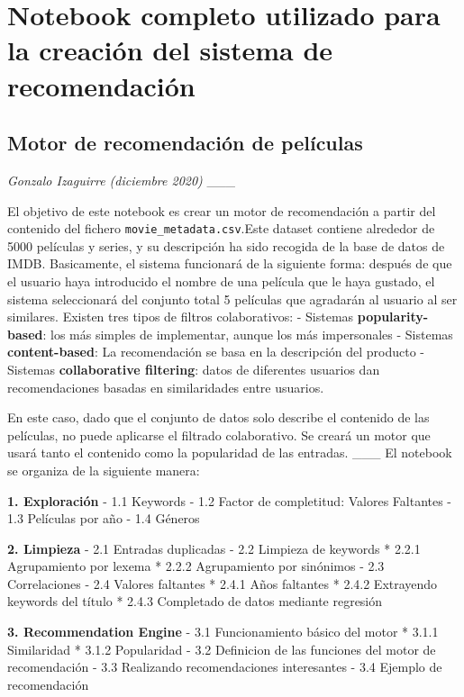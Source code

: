 \chapter{Notebook completo utilizado para la creación del sistema de recomendación}\label{app:notebook}

\section{\texorpdfstring{\textbf{Motor de recomendación de películas}}{Motor de recomendación de películas}}\label{film-recommendation-engine}

\emph{Gonzalo Izaguirre (diciembre 2020)} \_\_\_

El objetivo de este notebook es crear un motor de recomendación a partir
del contenido del fichero \texttt{movie\_metadata.csv}.Este dataset
contiene alrededor de 5000 películas y series, y su descripción ha sido
recogida de la base de datos de IMDB. Basicamente, el sistema funcionará
de la siguiente forma: después de que el usuario haya introducido el
nombre de una película que le haya gustado, el sistema seleccionará del
conjunto total 5 películas que agradarán al usuario al ser similares.
Existen tres tipos de filtros colaborativos: - Sistemas
\textbf{popularity-based}: los más simples de implementar, aunque los
más impersonales - Sistemas \textbf{content-based}: La recomendación se
basa en la descripción del producto - Sistemas \textbf{collaborative
filtering}: datos de diferentes usuarios dan recomendaciones basadas en
similaridades entre usuarios.

En este caso, dado que el conjunto de datos solo describe el contenido
de las películas, no puede aplicarse el filtrado colaborativo. Se creará
un motor que usará tanto el contenido como la popularidad de las
entradas. \_\_\_ El notebook se organiza de la siguiente manera:

\textbf{1. Exploración} - 1.1 Keywords - 1.2 Factor de completitud:
Valores Faltantes - 1.3 Películas por año - 1.4 Géneros

\textbf{2. Limpieza} - 2.1 Entradas duplicadas - 2.2 Limpieza de
keywords * 2.2.1 Agrupamiento por lexema * 2.2.2 Agrupamiento por
sinónimos - 2.3 Correlaciones - 2.4 Valores faltantes * 2.4.1 Años
faltantes * 2.4.2 Extrayendo keywords del título * 2.4.3 Completado de
datos mediante regresión

\textbf{3. Recommendation Engine} - 3.1 Funcionamiento básico del motor
* 3.1.1 Similaridad * 3.1.2 Popularidad - 3.2 Definicion de las
funciones del motor de recomendación - 3.3 Realizando recomendaciones
interesantes - 3.4 Ejemplo de recomendación

